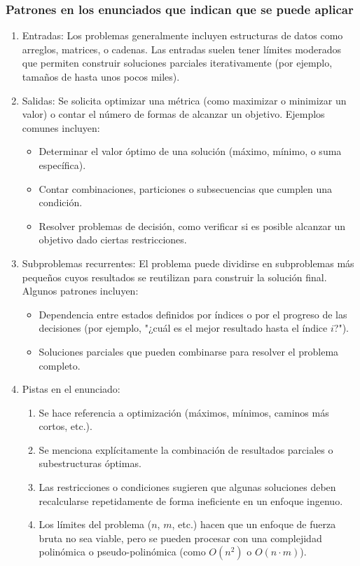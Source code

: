 \subsubsection{Patrones en los enunciados que indican que se puede aplicar}
\begin{enumerate} 
  \item Entradas: Los problemas generalmente incluyen estructuras de datos como arreglos, matrices, o cadenas. Las entradas suelen tener límites moderados que permiten construir soluciones parciales iterativamente (por ejemplo, tamaños de hasta unos pocos miles). 
  \item Salidas: Se solicita optimizar una métrica (como maximizar o minimizar un valor) o contar el número de formas de alcanzar un objetivo. Ejemplos comunes incluyen: 
  \begin{itemize} 
    \item Determinar el valor óptimo de una solución (máximo, mínimo, o suma específica). \item Contar combinaciones, particiones o subsecuencias que cumplen una condición. 
    \item Resolver problemas de decisión, como verificar si es posible alcanzar un objetivo dado ciertas restricciones. 
  \end{itemize} 
  \item Subproblemas recurrentes: El problema puede dividirse en subproblemas más pequeños cuyos resultados se reutilizan para construir la solución final. Algunos patrones incluyen: 
  \begin{itemize} 
    \item Dependencia entre estados definidos por índices o por el progreso de las decisiones (por ejemplo, "¿cuál es el mejor resultado hasta el índice $i$?"). 
    \item Soluciones parciales que pueden combinarse para resolver el problema completo. 
  \end{itemize} 
  \item Pistas en el enunciado: 
  \begin{enumerate} 
    \item Se hace referencia a optimización (máximos, mínimos, caminos más cortos, etc.). \item Se menciona explícitamente la combinación de resultados parciales o subestructuras óptimas. 
    \item Las restricciones o condiciones sugieren que algunas soluciones deben recalcularse repetidamente de forma ineficiente en un enfoque ingenuo. 
    \item Los límites del problema ($n$, $m$, etc.) hacen que un enfoque de fuerza bruta no sea viable, pero se pueden procesar con una complejidad polinómica o pseudo-polinómica (como $O(n^2)$ o $O(n \cdot m)$). 
  \end{enumerate} 
\end{enumerate}

